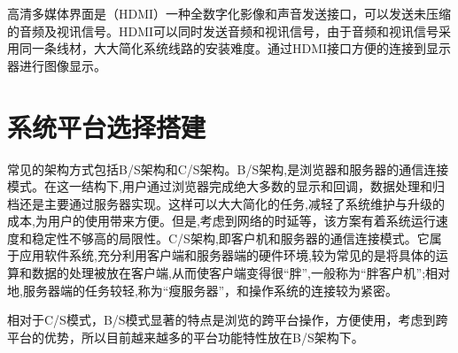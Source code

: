 高清多媒体界面是（HDMI）一种全数字化影像和声音发送接口，可以发送未压缩的音频及视讯信号。HDMI可以同时发送音频和视讯信号，由于音频和视讯信号采用同一条线材，大大简化系统线路的安装难度。通过HDMI接口方便的连接到显示器进行图像显示。



\section{系统平台选择搭建}
常见的架构方式包括B/S架构和C/S架构。B/S架构,是浏览器和服务器的通信连接模式。在这一结构下,用户通过浏览器完成绝大多数的显示和回调，数据处理和归档还是主要通过服务器实现。这样可以大大简化的任务,减轻了系统维护与升级的成本,为用户的使用带来方便。但是,考虑到网络的时延等，该方案有着系统运行速度和稳定性不够高的局限性。C/S架构,即客户机和服务器的通信连接模式。它属于应用软件系统,充分利用客户端和服务器端的硬件环境,较为常见的是将具体的运算和数据的处理被放在客户端,从而使客户端变得很“胖”,一般称为“胖客户机”;相对地,服务器端的任务较轻,称为“瘦服务器”，和操作系统的连接较为紧密\cite{bscs}。

相对于C/S模式，B/S模式显著的特点是浏览的跨平台操作，方便使用，考虑到跨平台的优势，所以目前越来越多的平台功能特性放在B/S架构下\cite{bshome}。
